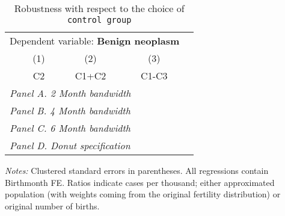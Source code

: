  \begin{table}[H] \begin{threeparttable} \centering \caption{Robustness with respect to the choice of \texttt{control group}} {\def\sym#1{\ifmmode^{#1}\else\(^{#1}\)\fi} \begin{tabular}{l*{4}{c}} \toprule \multicolumn{4}{c}{Dependent variable: \textbf{Benign neoplasm}} \\ \cmidrule(lr){2-4}
            &\multicolumn{1}{c}{(1)}&\multicolumn{1}{c}{(2)}&\multicolumn{1}{c}{(3)}\\
            &\multicolumn{1}{c}{C2}&\multicolumn{1}{c}{C1+C2}&\multicolumn{1}{c}{C1-C3}\\
\midrule
 \multicolumn{4}{l}{\emph{Panel A. 2 Month bandwidth}} \\    \midrule\multicolumn{4}{l}{\emph{Panel B. 4 Month bandwidth}} \\    \midrule\multicolumn{4}{l}{\emph{Panel C. 6 Month bandwidth}} \\    \midrule\multicolumn{4}{l}{\emph{Panel D. Donut specification}} \\    
\bottomrule \end{tabular} } \begin{tablenotes} \item \scriptsize \emph{Notes:} Clustered standard errors in parentheses. All regressions contain Birthmonth FE. Ratios indicate cases per thousand; either approximated population (with weights coming from the original fertility distribution) or original number of births. \end{tablenotes} \end{threeparttable} \end{table} 
